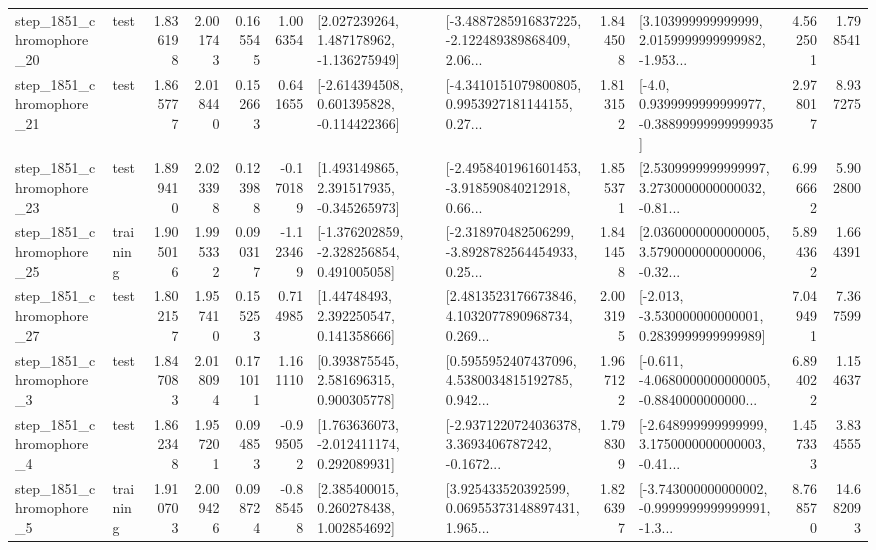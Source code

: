 \begin{tabular}{llrrrrllrlrr}
 step\_1851\_chromophore\_20 &      test &      1.836198 &    2.001743 &      0.165545 &  1.006354 &    [2.027239264, 1.487178962, -1.136275949] &  [-3.4887285916837225, -2.122489389868409, 2.06... &       1.844508 &  [3.103999999999999, 2.0159999999999982, -1.953... &            4.562501 &          1.798541 \\
 step\_1851\_chromophore\_21 &      test &      1.865777 &    2.018440 &      0.152663 &  0.641655 &   [-2.614394508, 0.601395828, -0.114422366] &  [-4.3410151079800805, 0.9953927181144155, 0.27... &       1.813152 &   [-4.0, 0.9399999999999977, -0.38899999999999935] &            2.978017 &          8.937275 \\
 step\_1851\_chromophore\_23 &      test &      1.899410 &    2.023398 &      0.123988 & -0.170189 &    [1.493149865, 2.391517935, -0.345265973] &  [-2.4958401961601453, -3.918590840212918, 0.66... &       1.855371 &  [2.5309999999999997, 3.2730000000000032, -0.81... &            6.996662 &          5.902800 \\
 step\_1851\_chromophore\_25 &  training &      1.905016 &    1.995332 &      0.090317 & -1.123469 &   [-1.376202859, -2.328256854, 0.491005058] &  [-2.318970482506299, -3.8928782564454933, 0.25... &       1.841458 &  [2.0360000000000005, 3.5790000000000006, -0.32... &            5.894362 &          1.664391 \\
 step\_1851\_chromophore\_27 &      test &      1.802157 &    1.957410 &      0.155253 &  0.714985 &      [1.44748493, 2.392250547, 0.141358666] &  [2.4813523176673846, 4.1032077890968734, 0.269... &       2.003195 &   [-2.013, -3.530000000000001, 0.2839999999999989] &            7.049491 &          7.367599 \\
  step\_1851\_chromophore\_3 &      test &      1.847083 &    2.018094 &      0.171011 &  1.161110 &     [0.393875545, 2.581696315, 0.900305778] &  [0.5955952407437096, 4.5380034815192785, 0.942... &       1.967122 &  [-0.611, -4.0680000000000005, -0.8840000000000... &            6.894022 &          1.154637 \\
  step\_1851\_chromophore\_4 &      test &      1.862348 &    1.957201 &      0.094853 & -0.995052 &    [1.763636073, -2.012411174, 0.292089931] &  [-2.9371220724036378, 3.3693406787242, -0.1672... &       1.798309 &  [-2.648999999999999, 3.1750000000000003, -0.41... &            1.457333 &          3.834555 \\
  step\_1851\_chromophore\_5 &  training &      1.910703 &    2.009426 &      0.098724 & -0.885458 &     [2.385400015, 0.260278438, 1.002854692] &  [3.925433520392599, 0.06955373148897431, 1.965... &       1.826397 &  [-3.743000000000002, -0.9999999999999991, -1.3... &            8.768570 &         14.682093 \\

\end{tabular}
